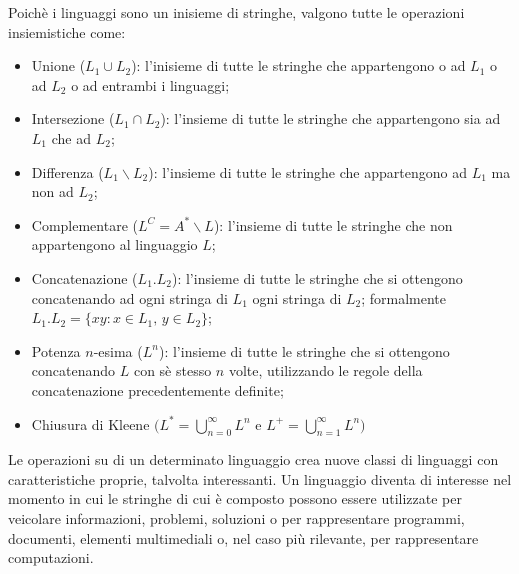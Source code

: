   \noindent 
  Poichè i linguaggi sono un inisieme di stringhe, valgono tutte le operazioni insiemistiche come:
  \begin{itemize}
    \item Unione (\(L_1\cup L_2\)): l'inisieme di tutte le stringhe che appartengono o ad \(L_1\) o ad \(L_2\) o ad entrambi i linguaggi;
    \item Intersezione (\(L_1 \cap L_2\)): l'insieme di tutte le stringhe che appartengono sia ad \(L_1\) che ad \(L_2\);
    \item Differenza (\(L_1\backslash L_2\)): l'insieme di tutte le stringhe che appartengono ad \(L_1\) ma non ad \(L_2\);
    \item Complementare (\(L^C = A^* \backslash L\)): l'insieme di tutte le stringhe che non appartengono al linguaggio \(L\);
    \item Concatenazione (\(L_1.L_2\)): l'insieme di tutte le stringhe che si ottengono concatenando ad ogni stringa di \(L_1\) ogni stringa di \(L_2\); formalmente \(L_1.L_2=\{xy:x\in L_1, \, y\in L_2\}\);
    \item Potenza \(n\)-esima (\(L^n\)): l'insieme di tutte le stringhe che si ottengono concatenando \(L\) con sè stesso \(n\) volte, utilizzando le regole della concatenazione precedentemente definite;
    \item Chiusura di Kleene \(\biggl(\displaystyle L^*=\bigcup_{n=0}^\infty L^n\) e \(\displaystyle L^+=\bigcup_{n=1}^\infty L^n\biggr)\)
  \end{itemize}
  Le operazioni su di un determinato linguaggio crea nuove classi di linguaggi con caratteristiche proprie, talvolta interessanti. Un linguaggio diventa di interesse nel momento in cui le stringhe di cui è composto possono essere utilizzate per veicolare informazioni, problemi, soluzioni o per rappresentare programmi, documenti, elementi multimediali o, nel caso più rilevante, per rappresentare computazioni.